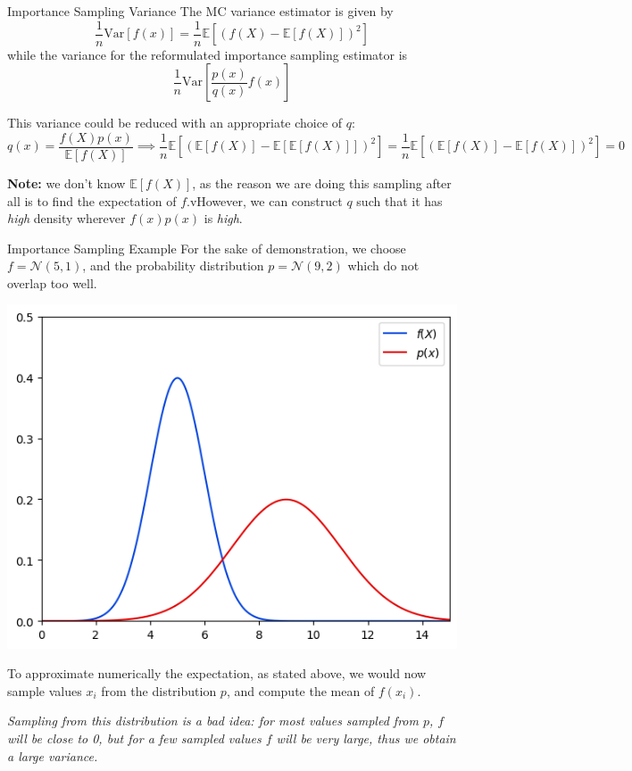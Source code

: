 \documentclass{beamer}
\begin{document}
\begin{frame}{Importance Sampling Variance}
The MC variance estimator is given by
\begin{equation*}
\frac{1}{n}\text{Var}[f(x)] = \frac{1}{n}\mathbb{E}[(f(X)-\mathbb{E}[f(X)])^2]
\end{equation*}
while the variance for the reformulated importance sampling estimator is
\begin{equation*}
\frac{1}{n}\text{Var}\left[\frac{p(x)}{q(x)}f(x)\right]
\end{equation*}

This variance could be reduced with an appropriate choice of $q$:
\begin{equation*}
q(x)=\frac{f(X)p(x)}{\mathbb{E}[f(X)]} \implies  \frac{1}{n}\mathbb{E}[(\mathbb{E}[f(X)]-\mathbb{E}[\mathbb{E}[f(X)]])^2]=\frac{1}{n}\mathbb{E}[(\mathbb{E}[f(X)]-\mathbb{E}[f(X)])^2] = 0
\end{equation*}

\textbf{Note:} we don’t know $\mathbb{E}[f(X)]$, as the reason we are doing this sampling after all is to find the expectation of $f$.vHowever, we can construct $q$ such that it has \emph{high} density wherever $f(x)p(x)$ is \emph{high}.
\end{frame}



\begin{frame}{Importance Sampling Example}
For the sake of demonstration, we choose $f=\mathcal{N}(5, 1)$, and the probability distribution $p=\mathcal{N}(9,2)$ which do not overlap too well.
\begin{center}
	\includegraphics[width=0.3\linewidth]{images/is_original_distributions}
\end{center}

To approximate numerically the expectation, as stated above, we would now sample values $x_i$ from the distribution $p$, and compute the mean of $f(x_i)$.

\emph{Sampling from this distribution is a bad idea: for most values sampled from $p$, $f$ will be close to 0, but for a few sampled values $f$ will be very large, thus we obtain a large variance.}
\end{frame}
\end{document}

